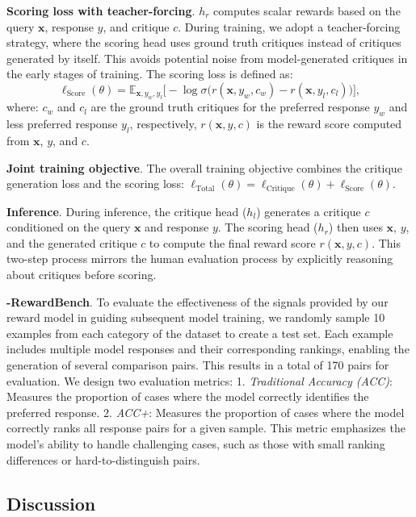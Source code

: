 \textbf{Scoring loss with teacher-forcing}. $h_r$ computes scalar rewards based on the query $\mathbf{x}$, response $y$, and critique $c$. During training, we adopt a teacher-forcing strategy, where the scoring head uses ground truth critiques instead of critiques generated by itself. This avoids potential noise from model-generated critiques in the early stages of training. The scoring loss is defined as:
\begin{equation}
\ell_{\text{Score}}(\theta) = 
\mathbb{E}_{\mathbf{x}, y_w, y_l} 
\Big[ 
    - \log \sigma \Big( 
        r(\mathbf{x}, y_w, c_w) - r(\mathbf{x}, y_l, c_l) 
    \Big)
\Big],
\end{equation}
where: $c_w$ and $c_l$ are the ground truth critiques for the preferred response $y_w$ and less preferred response $y_l$, respectively, $r(\mathbf{x}, y, c)$ is the reward score computed from $\mathbf{x}$, $y$, and $c$.

\textbf{Joint training objective}. The overall training objective combines the critique generation loss and the scoring loss:
$
\ell_{\text{Total}}(\theta) = \ell_{\text{Critique}}(\theta) + \ell_{\text{Score}}(\theta).
$

\textbf{Inference}. During inference, the critique head ($h_l$) generates a critique $c$ conditioned on the query $\mathbf{x}$ and response $y$. The scoring head ($h_r$) then uses $\mathbf{x}$, $y$, and the generated critique $c$ to compute the final reward score $r(\mathbf{x}, y, c)$. This two-step process mirrors the human evaluation process by explicitly reasoning about critiques before scoring.


\textbf{\abbr-RewardBench}.
To evaluate the effectiveness of the signals provided by our reward model in guiding subsequent model training, we randomly sample 10 examples from each category of the \abbr dataset to create a test set. Each example includes multiple model responses and their corresponding rankings, enabling the generation of several comparison pairs. This results in a total of 170 pairs for evaluation. We design two evaluation metrics: 
1. \textit{Traditional Accuracy (ACC)}: Measures the proportion of cases where the model correctly identifies the preferred response.
2. \textit{ACC+}: Measures the proportion of cases where the model correctly ranks all response pairs for a given sample. This metric emphasizes the model's ability to handle challenging cases, such as those with small ranking differences or hard-to-distinguish pairs.
\subsection{Discussion}

